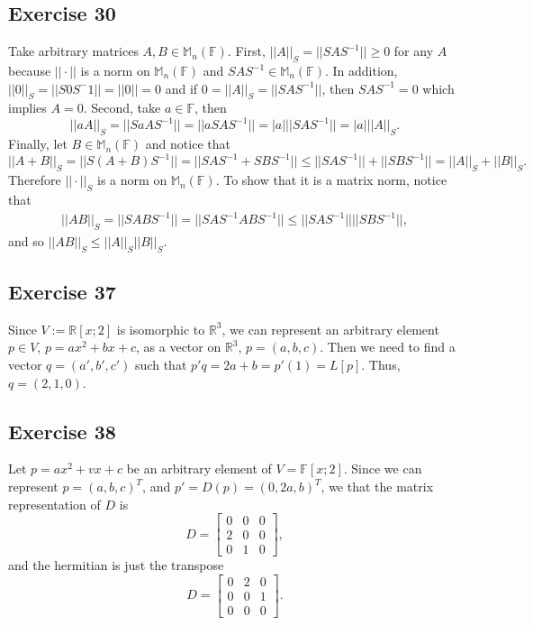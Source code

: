 \documentclass[11.5pt, letterpaper, bibtotoc,
    tablecaptionabove, figurecaptionabove]{article}
\begin{document}
\subsection*{Exercise 30}
Take arbitrary matrices $A,B\in\mathbb M_n(\mathbb F)$.
First, $||A||_S=||SAS^{-1}||\geq 0$ for any $A$ because 
$||\cdot||$ is a norm on $\mathbb M_n(\mathbb F)$ and 
$SAS^{-1}\in\mathbb M_n(\mathbb F)$.
In addition, $||0||_S=||S0S^-1||=||0||=0$ and if
$0=||A||_S=||SAS^{-1}||$, then $SAS^{-1}=0$ which implies $A=0$.
Second, take $a\in\mathbb F$, then 
\begin{equation*}
    ||aA||_S=||SaAS^{-1}||=
    ||aSAS^{-1}||=|a|||SAS^{-1}||=
    |a|||A||_S.
\end{equation*}
Finally, let $B\in\mathbb M_n(\mathbb F)$ and notice that
\begin{equation*}
    ||A+B||_S=||S(A+B)S^{-1}||=
    ||SAS^{-1}+SBS^{-1}||\leq||SAS^{-1}||+||SBS^{-1}||=
    ||A||_S+||B||_S.
\end{equation*}
Therefore $||\cdot||_S$ is a norm on $\mathbb M_n(\mathbb F)$.
To show that it is a matrix norm, notice that
\begin{align*}
    ||AB||_S=||SABS^{-1}||=
    ||SAS^{-1}ABS^{-1}||\leq
    ||SAS^{-1}||||SBS^{-1}||,
\end{align*}
and so $||AB||_S\leq||A||_S||B||_S$.

\subsection*{Exercise 37}
Since $V:=\mathbb R[x; 2]$ is isomorphic to $\mathbb R^3$,
we can represent an arbitrary element $p\in V$, $p=ax^2+bx+c$,
as a vector on $\mathbb R^3$, $p=(a, b, c)$.
Then we need to find a vector $q=(a', b', c')$ such that
$p'q=2a+b=p'(1)=L[p]$.
Thus, $q=(2, 1, 0)$.

\subsection*{Exercise 38}
Let $p=ax^2+vx+c$ be an arbitrary element of $V=\mathbb F[x;2]$.
Since we can represent $p=(a, b, c)^T$, and $p'=D(p)=(0,2a,b)^T$,
we that the matrix representation of $D$ is
\begin{equation*}
    D = \begin{bmatrix}
        0 & 0 & 0\\
        2 & 0 & 0\\
        0 & 1 & 0
    \end{bmatrix},
\end{equation*}
and the hermitian is just the transpose
\begin{equation*}
    D = \begin{bmatrix}
        0 & 2 & 0\\
        0 & 0 & 1\\
        0 & 0 & 0
    \end{bmatrix}.
\end{equation*}
\end{document}
